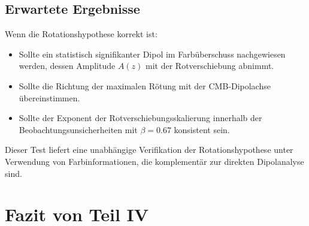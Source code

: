 \documentclass[11pt,a4paper]{article}
\begin{document}
	\subsection{Erwartete Ergebnisse}
	
	Wenn die Rotationshypothese korrekt ist:
	\begin{itemize}
		\item Sollte ein statistisch signifikanter Dipol im Farbüberschuss nachgewiesen werden, dessen Amplitude \(A(z)\) mit der Rotverschiebung abnimmt.
		\item Sollte die Richtung der maximalen Rötung mit der CMB‑Dipolachse übereinstimmen.
		\item Sollte der Exponent der Rotverschiebungsskalierung innerhalb der Beobachtungsunsicherheiten mit \(\beta = 0.67\) konsistent sein.
	\end{itemize}
	
	Dieser Test liefert eine unabhängige Verifikation der Rotationshypothese unter Verwendung von Farbinformationen, die komplementär zur direkten Dipolanalyse sind.
	
	\section{Fazit von Teil IV}
	
\end{document}
